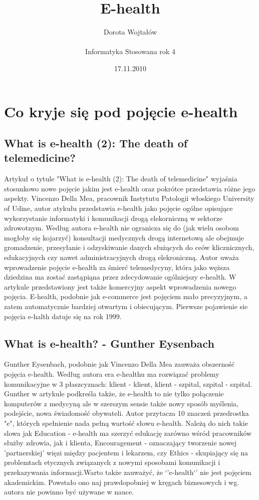 \documentclass[a4paper,10pt]{article}
\begin{document}
\title{E-health}
 \author{ \LARGE Dorota Wojtałów \\ \\ \Large Informatyka Stosowana rok 4}
\date{17.11.2010}
\maketitle
\section{ Co kryje się pod pojęcie e-health}
\subsection {What is e-health (2): The death of telemedicine?}
Artykuł o tytule "What is e-health (2): The death of telemedicine" wyjaśnia stosunkowo nowe pojęcie jakim jest e-health oraz pokrótce przedstawia
różne jego aspekty. Vincenzo Della Mea, pracownik Instytutu Patologii włoskiego University of Udine, autor atykułu przedstawia e-health jako pojęcie 
ogólne opisujące wykorzystanie informatyki i komunikacji drogą elekorniczną w sektorze zdrowotnym. Według autora e-health nie ogranicza się do (jak wielu osobom
mogłoby się kojarzyć)
konsultacji medycznych drogą internetową  ale obejmuje gromadzenie, przesyłanie i odzyskiwanie danych służących do ceów klicznicznych, edukacyjnych czy nawet administracyjnych drogą elekroniczną.
Autor uważa wprowadzenie pojęcie e-health  za śmierć telemedycyny, która jako węższa dziedzina ma zostać zastąpiąna przez zdecydowanie ogólniejszy e-health.
W artykule przedstawiony jest także komercyjny aspekt wprowadzenia nowego pojęcia. E-health, podobnie jak e-commerce jest pojęciem mało precyzyjnym, a zatem
automatycznie bardziej otwartym i obiecującym.
Pierwsze pojawienie sie pojęcia e-halth datuje się na rok 1999.

\subsection{What is e-health? - Gunther Eysenbach}
Gunther Eysenbach, podobnie jak Vincenzo Della Mea zauważa obszerność pojęcia e-health. Według autora era e-healthu ma rozwiązać problemy komunikacyjne 
w 3 płaszcyznach: klient - klient, klient - szpital, szpital - szpital. Gunther w artykule podkreśla także, że e-health to nie tylko połączenie 
komputerów z medycyną ale w szerszym sensie także nowy sposób myślenia, podejście, nowa świadomość obywateli. Autor przytacza  10 znaczeń przedrostka
"e", których spełnienie nada pełną wartość słowu e-health. Należą do nich 
takie slowa jak Education - e-health ma szerzyć edukację zarówno wśród pracowników służby zdrowia, jak i klienta,
Encouragement - oznaczający tworzenie nowej 'partnerskiej' więzi między pacjentem i lekarzem,
czy Ethics - skupiający się na problemtach etycznych związanych z nowymi sposobami komunikacji i przekazywania informacji.Warto także zauważyć, że `'e-health`' nie jest pojęciem akademickim. Powstało ono naj
prawdopobniej w kręgach biznesowych i wg. autora nie powinno być używane w nauce.
\end{document}
